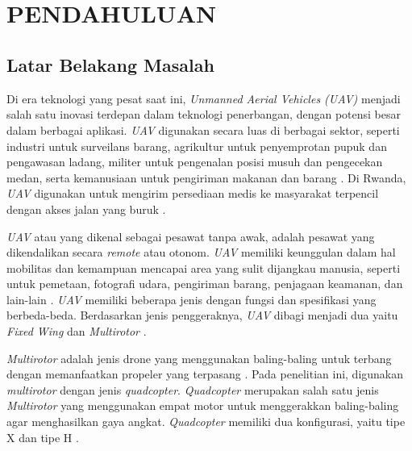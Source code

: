 
\chapter[PENDAHULUAN]{\\ PENDAHULUAN}

\section{Latar Belakang Masalah}

Di era teknologi yang pesat saat ini, \textit{Unmanned Aerial Vehicles (UAV)} menjadi salah satu inovasi terdepan dalam teknologi penerbangan, dengan potensi besar dalam berbagai aplikasi. \textit{\textit{UAV}} digunakan secara luas di berbagai sektor, seperti industri untuk surveilans barang, agrikultur untuk penyemprotan pupuk dan pengawasan ladang, militer untuk pengenalan posisi musuh dan pengecekan medan, serta kemanusiaan untuk pengiriman makanan dan barang \citep{usman2020database}. Di Rwanda, \textit{UAV} digunakan untuk mengirim persediaan medis ke masyarakat terpencil dengan akses jalan yang buruk \citep{hirarki_2020}. 

\textit{UAV} atau yang dikenal sebagai pesawat tanpa awak, adalah pesawat yang dikendalikan secara \textit{remote} atau otonom. \textit{UAV} memiliki keunggulan dalam hal mobilitas dan kemampuan mencapai area yang sulit dijangkau manusia, seperti untuk pemetaan, fotografi udara, pengiriman barang, penjagaan keamanan, dan lain-lain \citep{anggara2018rancang}. \textit{UAV} memiliki beberapa jenis dengan fungsi dan spesifikasi yang berbeda-beda. Berdasarkan jenis penggeraknya, \textit{UAV} dibagi menjadi dua yaitu \textit{Fixed Wing} dan \textit{Multirotor} \citep{jenisdrone}.  

\textit{Multirotor} adalah jenis drone yang menggunakan baling-baling untuk terbang dengan memanfaatkan propeler yang terpasang \citep{ariyanto2020ta}. Pada penelitian ini, digunakan \textit{multirotor} dengan jenis \textit{quadcopter}. \textit{Quadcopter} merupakan salah satu jenis \textit{Multirotor} yang menggunakan empat motor untuk menggerakkan baling-baling agar menghasilkan gaya angkat. \textit{Quadcopter} memiliki dua konfigurasi, yaitu tipe X dan tipe H \citep{yofan2016sistem}.


